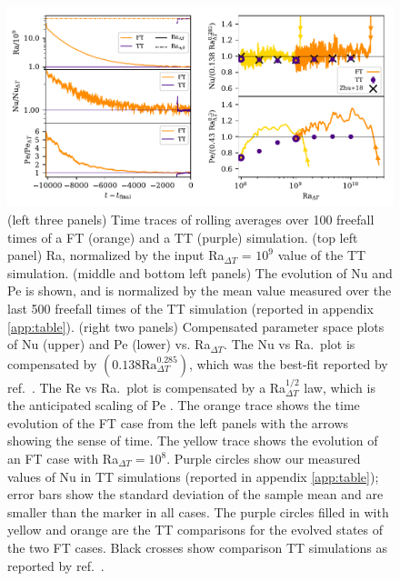 \documentclass[aps, pre, onecolumn, nofootinbib, notitlepage, groupedaddress, amsfonts, amssymb, amsmath, longbibliography, superscriptaddress]{revtex4-1}
\begin{document}
\begin{figure}
\includegraphics[width=\textwidth]{./figs/rbc_scalar_comparisons.pdf}
\caption{ 
	(left three panels) Time traces of rolling averages over 100 freefall times of a FT (orange) and a TT (purple) simulation.
	(top left panel) Ra, normalized by the input Ra$_{\Delta T}$ = $10^9$ value of the TT simulation.
	(middle and bottom left panels) The evolution of Nu and Pe is shown, and is normalized by the mean value measured over the last 500 freefall times of the TT simulation (reported in appendix \ref{app:table}).
	(right two panels) Compensated parameter space plots of Nu (upper) and Pe (lower) vs. Ra$_{\Delta T}$.
	The Nu vs Ra.~plot is compensated by $(0.138 \text{Ra}_{\Delta T}^{0.285})$, which was the best-fit reported by ref.~\cite{johnston&doering2009}.
	The Re vs Ra.~plot is compensated by a Ra$_{\Delta T}^{1/2}$ law, which is the anticipated scaling of Pe \cite{ahlers&all2009}.
	The orange trace shows the time evolution of the FT case from the left panels with the arrows showing the sense of time.
	The yellow trace shows the evolution of an FT case with Ra$_{\Delta T} = 10^8$.
	Purple circles show our measured values of Nu in TT simulations (reported in appendix \ref{app:table}); error bars show the standard deviation of the sample mean and are smaller than the marker in all cases.
	The purple circles filled in with yellow and orange are the TT comparisons for the evolved states of the two FT cases.
	Black crosses show comparison TT simulations as reported by ref.~\cite{zhu&all2018}.
\label{fig:rbc_scalar_comparisons} }
\end{figure}
\end{document}
